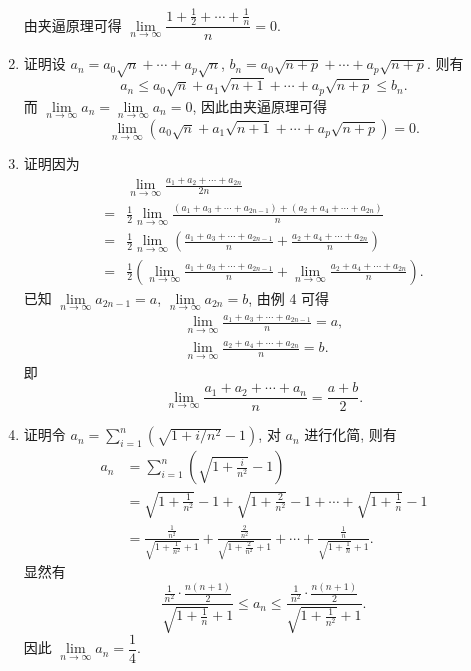 \begin{enumerate}
        由夹逼原理可得 $\lim\limits_{n\to\infty}\dfrac{1 + \frac 12 + \cdots + \frac 1n}{n} = 0$.
    \item %
        {\heiti 证明}\quad 设 $a_n = a_0\sqrt{n} + \cdots + a_p\sqrt{n}$, $b_n = a_0\sqrt{n + p} + \cdots + a_p\sqrt{n + p}$. 则有
        \[
            a_n \leqslant a_0\sqrt{n} + a_1\sqrt{n + 1} + \cdots + a_p\sqrt{n + p} \leqslant b_n.
        \]
        而 $\lim\limits_{n\to\infty}a_n = \lim\limits_{n\to\infty}a_n = 0$, 因此由夹逼原理可得
        \[
            \lim\limits_{n\to\infty}(a_0\sqrt{n} + a_1\sqrt{n + 1} + \cdots + a_p\sqrt{n + p}) = 0.    
        \]
    \item %
        {\heiti 证明}\quad 因为
        \begin{align*}
                & \lim_{n\to\infty}\frac{a_1 + a_2 + \cdots + a_{2n}}{2n} \\
            ={} & \frac12\lim_{n\to\infty}\frac{(a_1 + a_3 + \cdots + a_{2n-1}) + (a_2 + a_4 + \cdots + a_{2n})}{n} \\
            ={} & \frac12\lim_{n\to\infty}\left(\frac{a_1 + a_3 + \cdots + a_{2n-1}}{n} + \frac{a_2 + a_4 + \cdots + a_{2n}}{n}\right) \\
            ={} & \frac12\left(\lim_{n\to\infty}\frac{a_1 + a_3 + \cdots + a_{2n-1}}{n} + \lim_{n\to\infty}\frac{a_2 + a_4 + \cdots + a_{2n}}{n}\right).
        \end{align*}
        已知 $\lim\limits_{n\to\infty}a_{2n-1} = a$, $\lim\limits_{n\to\infty}a_{2n} = b$, 由例 4 可得
        \begin{gather*}
            \lim_{n\to\infty}\frac{a_1 + a_3 + \cdots + a_{2n-1}}{n} = a, \\
            \lim_{n\to\infty}\frac{a_2 + a_4 + \cdots + a_{2n}}{n} = b.
        \end{gather*}
        即
        \[
            \lim_{n\to\infty}\frac{a_1 + a_2 + \cdots + a_{n}}{n} = \frac{a+b}{2}.   
        \]
    \item %
        {\heiti 证明}\quad 令 $a_n = \sum\limits_{i=1}^n( \sqrt{1 + i/n^2} - 1)$, 对 $a_n$ 进行化简, 则有
        \begin{align*}
            a_n &= \sum_{i=1}^n\left( \sqrt{1 + \frac{i}{n^2}} - 1 \right) \\
                &= \sqrt{1 + \frac{1}{n^2}} - 1 + \sqrt{1 + \frac{2}{n^2}} - 1 + \cdots + \sqrt{1 + \frac{1}{n}} - 1 \\
                &= \frac{\frac{1}{n^2}}{\sqrt{1 + \frac{1}{n^2}} + 1} + \frac{\frac{2}{n^2}}{\sqrt{1 + \frac{2}{n^2}} + 1} + \cdots + \frac{\frac{1}{n}}{\sqrt{1 + \frac{1}{n}} + 1}.
        \end{align*}
        显然有
        \begin{equation*}
            \frac{\frac{1}{n^2} \cdot \frac{n(n+1)}{2}}{\sqrt{1 + \frac{1}{n}} + 1} \leqslant a_n \leqslant \frac{\frac{1}{n^2} \cdot \frac{n(n+1)}{2}}{\sqrt{1 + \frac{1}{n^2}} + 1}.
        \end{equation*}
        因此 $\lim\limits_{n\to\infty}a_n = \dfrac 14$.
\end{enumerate}

% 
